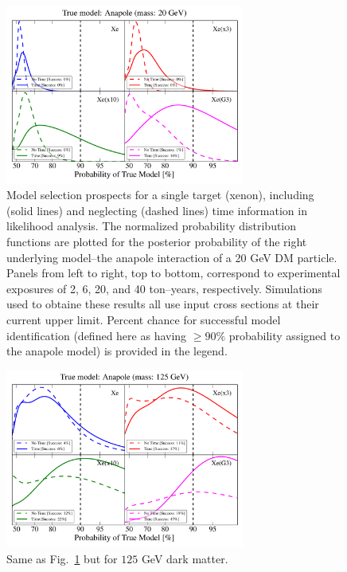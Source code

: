 \documentclass[11pt]{article}
\begin{document}
\begin{figure}
\centering
\includegraphics[width=0.7\textwidth]{plots/PDF_20GeV_Anapole_50sims_Xe_Xe3x_Xe10x_XeG3_GF_TNT.pdf}
\caption{\label{fig:20gev_anapole_XeFull_TNT_GF}
Model selection prospects for a single target (xenon), including (solid lines) and neglecting (dashed lines) time information in likelihood analysis. The normalized probability distribution functions are plotted for the posterior probability of the right underlying model--the anapole interaction of a 20 GeV DM particle. Panels from left to right, top to bottom, correspond to experimental exposures of 2, 6, 20, and 40 ton--years, respectively. Simulations used to obtaine these results all use input cross sections at their current upper limit. Percent chance for successful model identification (defined here as having $\geq 90 \%$ probability assigned to the anapole model) is provided in the legend.}
\end{figure}
\begin{figure}
\centering
\includegraphics[width=0.7\textwidth]{plots/PDF_125GeV_Anapole_50sims_Xe_Xe3x_Xe10x_XeG3_GF_TNT.pdf}
\caption{\label{fig:125gev_anapole_XeFull_TNT_GF}
Same as Fig.~\ref{fig:20gev_anapole_XeFull_TNT_GF} but for $125$ GeV dark matter.}
\end{figure}
\end{document}
